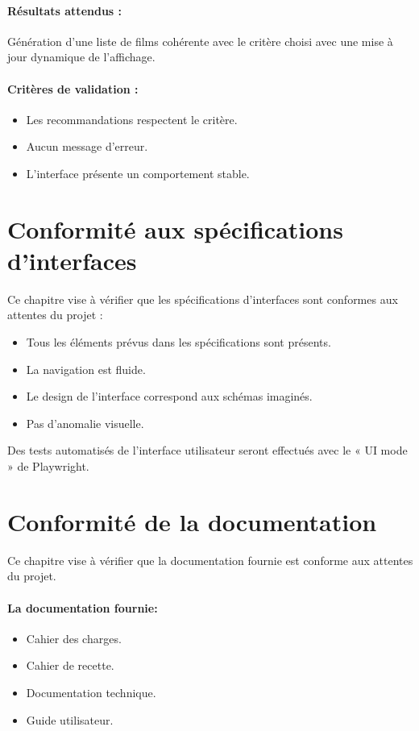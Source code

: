 \documentclass[a4paper,12pt]{report}
\begin{document}
\subsubsection{Résultats attendus :}
Génération d'une liste de films cohérente avec le critère choisi avec une mise à jour dynamique de l'affichage.
\subsubsection{Critères de validation :}
\begin{itemize}
    \item Les recommandations respectent le critère.
    \item Aucun message d'erreur.
    \item L'interface présente un comportement stable.
\end{itemize}


\chapter{Conformité aux spécifications d’interfaces}
\label{IW2}
Ce chapitre vise à vérifier que les spécifications d'interfaces sont conformes aux attentes du projet :
\begin{itemize}
    \item Tous les éléments prévus dans les spécifications sont présents.
    \item La navigation est fluide.
    \item Le design de l'interface correspond aux schémas imaginés.
    \item Pas d'anomalie visuelle.
\end{itemize}

Des tests automatisés de l’interface utilisateur seront effectués avec le « UI mode » de Playwright.

\chapter{Conformité de la documentation}
\label{Doc1}
Ce chapitre vise à vérifier que la documentation fournie est conforme aux attentes du projet.
\subsubsection*{La documentation fournie:}
\begin{itemize}
    \item Cahier des charges.
    \item Cahier de recette.
    \item Documentation technique.
    \item Guide utilisateur.
\end{itemize}
\end{document}

